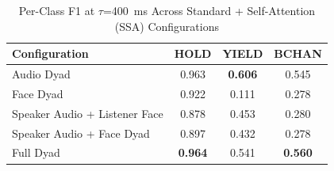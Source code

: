 \begin{table}[h]
\caption{Per-Class F1 at $\tau$=400~ms Across Standard + Self-Attention (SSA) Configurations}
\label{tab:f1_per_class_ssa}
\small
\renewcommand{\arraystretch}{1.20}
\begin{tabular}{>{\raggedright\arraybackslash}p{4cm}ccc}
\toprule
Configuration & HOLD & YIELD & BCHAN \\
\midrule
Audio Dyad & 0.963 & \textbf{0.606} & 0.545 \\
Face Dyad & 0.922 & 0.111 & 0.278 \\
Speaker Audio + Listener Face & 0.878 & 0.453 & 0.280 \\
Speaker Audio + Face Dyad & 0.897 & 0.432 & 0.278 \\
Full Dyad & \textbf{0.964} & 0.541 & \textbf{0.560} \\
\bottomrule
\end{tabular}
\end{table}
